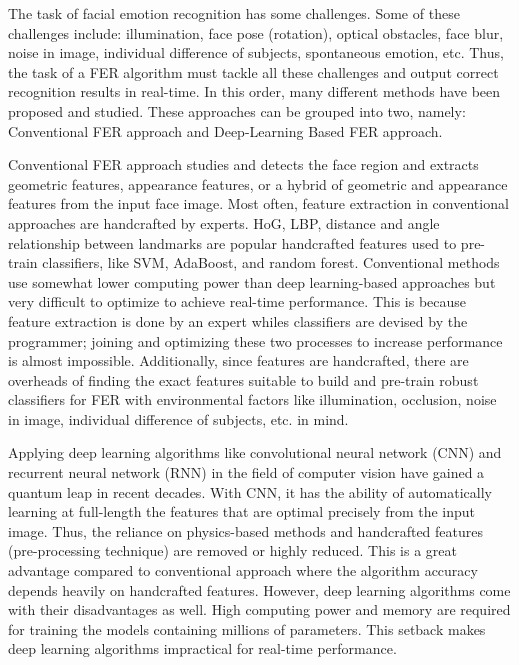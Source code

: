 \documentclass[master]{thesis-uestc}
\begin{document}
The task of facial emotion recognition has some challenges. Some of these challenges include: illumination, face pose (rotation), optical obstacles, face blur, noise in image, individual difference of subjects, spontaneous emotion, etc\cite{Ivanovsky-2017, josh2018}. Thus, the task of a FER algorithm must tackle all these challenges and output correct recognition results in real-time. In this order, many different methods have been proposed and studied. These approaches can be grouped into two, namely: Conventional FER approach and Deep-Learning Based FER approach\cite{Ivanovsky-2017}.

Conventional FER approach studies and detects the face region and extracts geometric features, appearance features, or a hybrid of geometric and appearance features from the input face image. Most often, feature extraction in conventional approaches are handcrafted by experts. HoG, LBP, distance and angle relationship between landmarks are popular handcrafted features used to pre-train classifiers, like SVM, AdaBoost, and random forest\cite{Ivanovsky-2017}. Conventional methods use somewhat lower computing power than deep learning-based approaches but very difficult to optimize to achieve real-time performance. This is because feature extraction is done by an expert whiles classifiers are devised by the programmer; joining and optimizing these two processes to increase performance is almost impossible\cite{Ivanovsky-2017}. Additionally, since features are handcrafted, there are overheads of finding the exact features suitable to build and pre-train robust classifiers for FER with environmental factors like illumination, occlusion, noise in image, individual difference of subjects, etc. in mind.

Applying deep learning algorithms like convolutional neural network (CNN) and recurrent neural network (RNN) in the field of computer vision have gained a quantum leap in recent decades. With CNN, it has the ability of automatically learning at full-length the features that are optimal precisely from the input image. Thus, the reliance on physics-based methods and handcrafted features (pre-processing technique) are removed or highly reduced. This is a great advantage compared to conventional approach where the algorithm accuracy depends heavily on handcrafted features. However, deep learning algorithms come with their disadvantages as well. High computing power and memory are required for training the models containing millions of parameters. This setback makes deep learning algorithms impractical for real-time performance.
\end{document}
